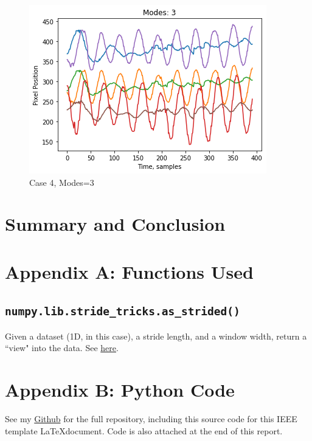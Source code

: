 \documentclass[journal]{IEEEtran}
\def\code#1{\texttt{#1}}
\begin{document}
\begin{figure}
	\centerline{\includegraphics[width=\columnwidth]{recon4.png}}
	\caption{Case 4, Modes=3}
	\label{recon4}
\end{figure}


\section{Summary and Conclusion}


\newpage
\clearpage
\newpage
\section{Appendix A: Functions Used}
\subsection{\code{numpy.lib.stride\_tricks.as\_strided()}}
Given a dataset (1D, in this case), a stride length, and a window width,
return a ``view" into the data. See \href{https://docs.scipy.org/doc/numpy/reference/generated/numpy.lib.stride_tricks.as_strided.html}{here}.


\newpage
\clearpage
\newpage
\section{Appendix B: Python Code}
See my \href{https://github.com/eric-silk/AMATH582_HW3}{Github} for the full repository, including this source code for this IEEE template \LaTeX document. Code is also attached at the end of this report.
\end{document}
